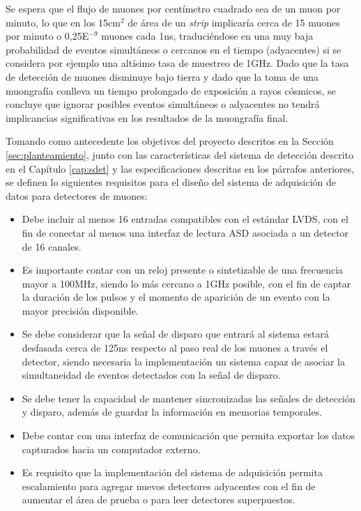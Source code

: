  	Se espera que el flujo de muones por centímetro cuadrado sea de un muon por minuto\cite{Rocca2018CosmicUs}, lo que en los 15cm$^2$ de área de un \textit{strip} implicaría cerca de 15 muones por minuto o 0,25E$^{-9}$ muones cada 1ns, traduciéndose en una muy baja probabilidad de eventos simultáneos o cercanos en el tiempo (adyacentes) si se considera por ejemplo una altísimo tasa de muestreo de 1GHz. Dado que la tasa de detección de muones disminuye bajo tierra y dado que la toma de una muongrafía conlleva un tiempo prolongado de exposición a rayos cósmicos, se concluye que ignorar posibles eventos simultáneos o adyacentes no tendrá implicancias significativas en los resultados de la muongrafía final.
	
	Tomando como antecedente los objetivos del proyecto descritos en la Sección \ref{sec:planteamiento}, junto con las características del sistema de detección descrito en el Capítulo \ref{cap:sdet} y las especificaciones descritas en los párrafos anteriores, se definen lo siguientes requisitos para el diseño del sistema de adquisición de datos para detectores de muones:
	
	\begin{itemize}
		\item Debe incluir al menos 16 entradas compatibles con el estándar LVDS, con el fin de conectar al menos una interfaz de lectura ASD asociada a un detector de 16 canales.
		\item Es importante contar con un reloj presente o sintetizable de una frecuencia mayor a 100MHz, siendo lo más cercano a 1GHz posible, con el fin de captar la duración de los pulsos y el momento de aparición de un evento con la mayor precisión disponible.
		\item Se debe considerar que la señal de disparo que entrará al sistema estará desfasada cerca de 125ns\cite{Oyanadel2020SistemaSTGC} respecto al paso real de los muones a través el detector, siendo necesaria la implementación un sistema capaz de asociar la simultaneidad de eventos detectados con la señal de disparo.
		\item  Se debe tener la capacidad de mantener sincronizadas las señales de detección y disparo, además de guardar la información en memorias temporales.
		\item Debe contar con una interfaz de comunicación que permita exportar los datos capturados hacia un computador externo.
		\item Es requisito que la implementación del sistema de adquisición permita escalamiento para agregar nuevos detectores adyacentes con el fin de aumentar el área de prueba o para leer detectores superpuestos.
	\end{itemize}
	
